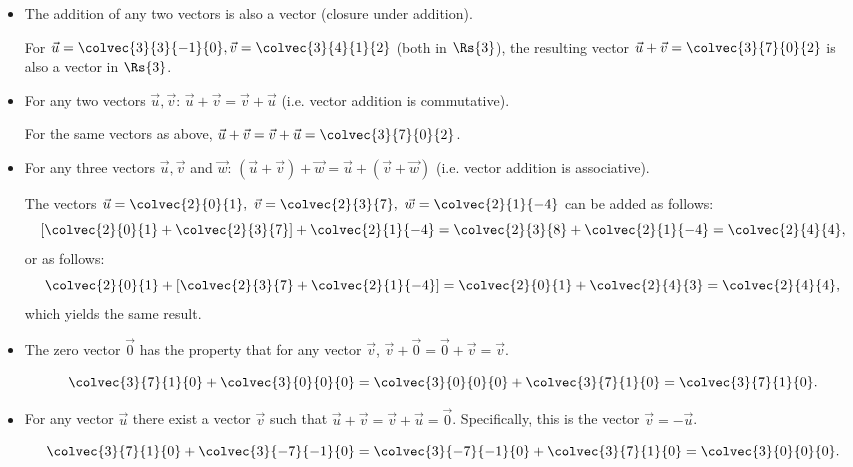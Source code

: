 \begin{itemize}
  \item The addition of any two vectors is also a vector (closure under addition).
    \begin{example}
      For $\vec{u}=\colvec{3}{3}{-1}{0}, \vec{v}=\colvec{3}{4}{1}{2}$ (both in $\Rs{3}$), the resulting vector $\vec{u}+\vec{v} = \colvec{3}{7}{0}{2}$ is also a vector in $\Rs{3}$.
    \end{example}
  \item For any two vectors $\vec{u},\vec{v}$: $\vec{u}+\vec{v} = \vec{v}+\vec{u}$ (i.e. vector addition is commutative).
    \begin{example}
      For the same vectors as above, $\vec{u}+\vec{v}=\vec{v}+\vec{u}=\colvec{3}{7}{0}{2}$.
    \end{example}
  \item For any three vectors $\vec{u},\vec{v}$ and $\vec{w}$: $\left(\vec{u}+\vec{v}\right)+\vec{w} = \vec{u}+\left( \vec{v}+\vec{w} \right)$ (i.e. vector addition is associative).
    \begin{example}
      The vectors $\vec{u}=\colvec{2}{0}{1},\ \vec{v}=\colvec{2}{3}{7},\ \vec{w}=\colvec{2}{1}{-4}$ can be added as follows:
      \begin{equation*}
        \left[\colvec{2}{0}{1}+\colvec{2}{3}{7}\right]+\colvec{2}{1}{-4} = \colvec{2}{3}{8}+\colvec{2}{1}{-4} = \colvec{2}{4}{4},
      \end{equation*}
      or as follows:
      \begin{equation*}
        \colvec{2}{0}{1} + \left[ \colvec{2}{3}{7} + \colvec{2}{1}{-4} \right] = \colvec{2}{0}{1} + \colvec{2}{4}{3} = \colvec{2}{4}{4},
      \end{equation*}
      which yields the same result.
    \end{example}
  \item The zero vector $\vec{0}$ has the property that for any vector $\vec{v}$, $\vec{v}+\vec{0} = \vec{0}+\vec{v} = \vec{v}$.
    \begin{example}
      \begin{equation*}
        \colvec{3}{7}{1}{0} + \colvec{3}{0}{0}{0} = \colvec{3}{0}{0}{0} + \colvec{3}{7}{1}{0} = \colvec{3}{7}{1}{0}.    
      \end{equation*}
    \end{example}
  \item For any vector $\vec{u}$ there exist a vector $\vec{v}$ such that $\vec{u}+\vec{v} = \vec{v}+\vec{u} = \vec{0}$. Specifically, this is the vector $\vec{v}=-\vec{u}$.
    \begin{example}
      \begin{equation*}
        \colvec{3}{7}{1}{0} + \colvec{3}{-7}{-1}{0} = \colvec{3}{-7}{-1}{0} + \colvec{3}{7}{1}{0} = \colvec{3}{0}{0}{0}.
      \end{equation*}
    \end{example}
\end{itemize}

